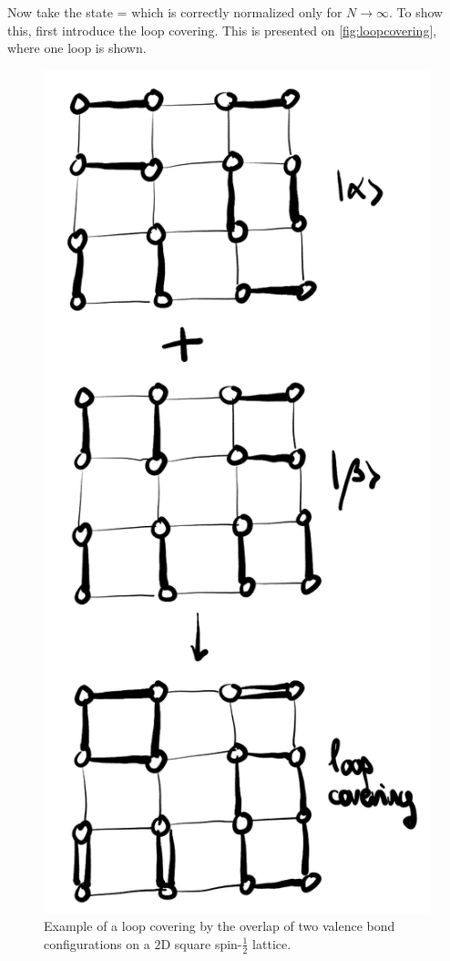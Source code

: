 		Now take the state
		\be \ket{\phi_\pm} =   \ee
		which is correctly normalized only for $N\to \infty$. To show this, first introduce the loop covering. This is presented on \autoref{fig:loopcovering}, where one loop is shown. 
		\begin{figure}[h!]
            \centering
            \includegraphics[scale=0.2]{graphs/loopcovering.png}
            \caption{Example of a loop covering by the overlap of two valence bond configurations on a $2$D square spin-$\frac{1}{2}$ lattice.}
            \label{fig:loopcovering}
        \end{figure}
